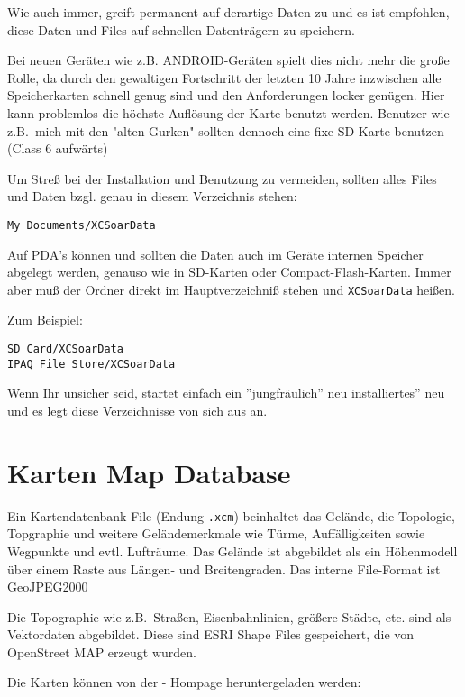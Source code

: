 Wie auch immer, \xc greift permanent auf derartige Daten zu und es ist empfohlen, diese Daten und
Files auf schnellen Datenträgern zu speichern.

Bei neuen Geräten wie z.B. ANDROID-Geräten spielt dies nicht mehr die große Rolle, da durch den
gewaltigen Fortschritt der letzten 10 Jahre inzwischen alle  Speicherkarten schnell genug sind und den
Anforderungen locker genügen. Hier kann problemlos die höchste Auflösung der Karte benutzt werden.
Benutzer wie z.B.\ mich mit den "alten Gurken" sollten dennoch eine fixe SD-Karte benutzen (Class 6
aufwärts)

Um Streß bei der Installation und Benutzung zu vermeiden, sollten alles Files und Daten bzgl. \xc  genau in
diesem Verzeichnis stehen:

\begin{verbatim}
My Documents/XCSoarData
\end{verbatim}

Auf PDA's können und sollten die Daten auch im Geräte internen Speicher abgelegt werden, genauso wie in
SD-Karten oder Compact-Flash-Karten. Immer aber muß der Ordner direkt im Hauptverzeichniß stehen und
\verb|XCSoarData| heißen.

Zum Beispiel:
\begin{verbatim}
SD Card/XCSoarData
IPAQ File Store/XCSoarData
\end{verbatim}

Wenn Ihr unsicher seid, startet einfach ein ''jungfräulich'' neu installiertes'' \xc neu und es legt diese
Verzeichnisse von sich aus an.

\section{Karten Map Database}\label{sec:map}

Ein Kartendatenbank-File (Endung \verb|.xcm|) beinhaltet das Gelände, die Topologie, Topgraphie und
weitere Geländemerkmale wie Türme, Auffälligkeiten sowie Wegpunkte und evtl. Lufträume.  Das
Gelände ist abgebildet als ein Höhenmodell über einem Raste aus Längen- und Breitengraden. Das interne
File-Format ist GeoJPEG2000

Die Topographie wie z.B.\ Straßen, Eisenbahnlinien, größere Städte, etc. sind als Vektordaten abgebildet.
Diese sind ESRI Shape Files gespeichert, die von OpenStreet MAP erzeugt wurden.

Die Karten können von der  \xc - Hompage heruntergeladen werden:

